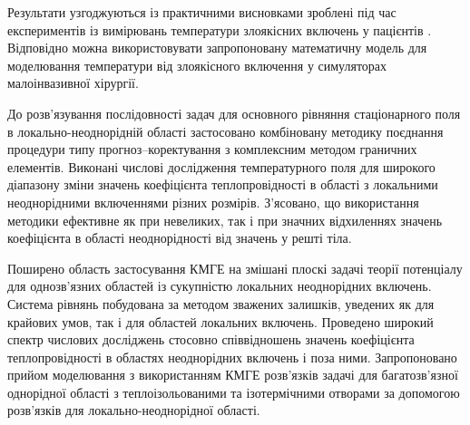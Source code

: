 Результати узгоджуються із практичними висновками зроблені під час експериментів із вимірювань температури злоякісних 
включень у пацієнтів \cite{temperature-difference-in-tumor-and-tissue}. Відповідно можна використовувати запропоновану 
математичну модель для моделювання температури від злоякісного включення у симуляторах малоінвазивної хірургії.

До розв'язування послідовності задач для основного рівняння стаціонарного 
поля в локально-неоднорідній області застосовано
комбіновану методику поєднання процедури типу прогноз--коректування з
комплексним методом граничних елементів. Виконані числові дослідження
температурного поля для широкого діапазону зміни значень коефіцієнта
теплопровідності в області з локальними неоднорідними включеннями різних
розмірів. З'ясовано, що використання методики ефективне як при
невеликих, так і при значних відхиленнях значень коефіцієнта в області
неоднорідності від значень у решті тіла.

Поширено область застосування КМГЕ на змішані плоскі задачі теорії потенціалу 
для однозв'язних областей із сукупністю локальних
неоднорідних включень. Система рівнянь побудована за методом зважених
залишків, уведених як для крайових умов, так і для областей локальних
включень. Проведено широкий спектр числових досліджень стосовно
співвідношень значень коефіцієнта теплопровідності в областях
неоднорідних включень і поза ними. Запропоновано прийом моделювання з
використанням КМГЕ розв'язків задачі для багатозв'язної однорідної\emph{
}області з теплоізольованими та ізотермічними отворами за допомогою
розв'язків для локально-неоднорідної\emph{ }області.
